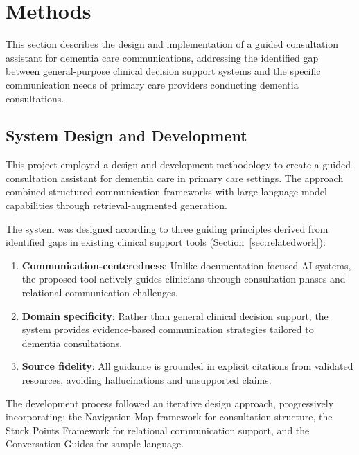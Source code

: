 \newpage
\section{Methods}\label{sec:methods}

This section describes the design and implementation of a guided consultation assistant for dementia care communications, addressing the identified gap between general-purpose clinical decision support systems and the specific communication needs of primary care providers conducting dementia consultations.

\subsection{System Design and Development}\label{sec:system_design}

This project employed a design and development methodology to create a guided consultation assistant for dementia care in primary care settings. The approach combined structured communication frameworks with large language model capabilities through retrieval-augmented generation.

The system was designed according to three guiding principles derived from identified gaps in existing clinical support tools (Section~\ref{sec:relatedwork}):

\begin{enumerate}
    \item \textbf{Communication-centeredness}: Unlike documentation-focused AI systems, the proposed tool actively guides clinicians through consultation phases and relational communication challenges.
    \item \textbf{Domain specificity}: Rather than general clinical decision support, the system provides evidence-based communication strategies tailored to dementia consultations.
    \item \textbf{Source fidelity}: All guidance is grounded in explicit citations from validated resources, avoiding hallucinations and unsupported claims.
\end{enumerate}

The development process followed an iterative design approach, progressively incorporating:
the Navigation Map framework for consultation structure,
the Stuck Points Framework for relational communication support,
and the Conversation Guides for sample language.


